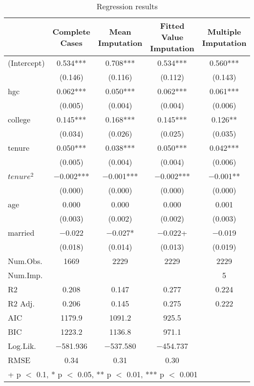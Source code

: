 \documentclass[nobib]{MSword}
\begin{document}
\begin{table}[hbt!]
\centering
\caption{Regression results}
\label{table:2}
\begin{tabular}[t]{lcccc}
\toprule
  & Complete Cases & Mean Imputation & Fitted Value Imputation & Multiple Imputation\\
\midrule
(Intercept) & \num{0.534}*** & \num{0.708}*** & \num{0.534}*** & \num{0.560}***\\
 & (\num{0.146}) & (\num{0.116}) & (\num{0.112}) & (\num{0.143})\\
hgc & \num{0.062}*** & \num{0.050}*** & \num{0.062}*** & \num{0.061}***\\
 & (\num{0.005}) & (\num{0.004}) & (\num{0.004}) & \vphantom{1} (\num{0.006})\\
college & \num{0.145}*** & \num{0.168}*** & \num{0.145}*** & \num{0.126}**\\
 & (\num{0.034}) & (\num{0.026}) & (\num{0.025}) & (\num{0.035})\\
tenure & \num{0.050}*** & \num{0.038}*** & \num{0.050}*** & \num{0.042}***\\
 & (\num{0.005}) & (\num{0.004}) & (\num{0.004}) & (\num{0.006})\\
$tenure^2$ & \num{-0.002}*** & \num{-0.001}*** & \num{-0.002}*** & \num{-0.001}**\\
 & (\num{0.000}) & (\num{0.000}) & (\num{0.000}) & (\num{0.000})\\
age & \num{0.000} & \num{0.000} & \num{0.000} & \num{0.001}\\
 & (\num{0.003}) & (\num{0.002}) & (\num{0.002}) & (\num{0.003})\\
married & \num{-0.022} & \num{-0.027}* & \num{-0.022}+ & \num{-0.019}\\
 & (\num{0.018}) & (\num{0.014}) & (\num{0.013}) & (\num{0.019})\\
\midrule
Num.Obs. & \num{1669} & \num{2229} & \num{2229} & \num{2229}\\
Num.Imp. &  &  &  & \num{5}\\
R2 & \num{0.208} & \num{0.147} & \num{0.277} & \num{0.224}\\
R2 Adj. & \num{0.206} & \num{0.145} & \num{0.275} & \num{0.222}\\
AIC & \num{1179.9} & \num{1091.2} & \num{925.5} & \\
BIC & \num{1223.2} & \num{1136.8} & \num{971.1} & \\
Log.Lik. & \num{-581.936} & \num{-537.580} & \num{-454.737} & \\
RMSE & \num{0.34} & \num{0.31} & \num{0.30} & \\
\bottomrule
\multicolumn{5}{l}{\rule{0pt}{1em}+ p $<$ 0.1, * p $<$ 0.05, ** p $<$ 0.01, *** p $<$ 0.001}\\
\end{tabular}
\end{table}
\end{document}
